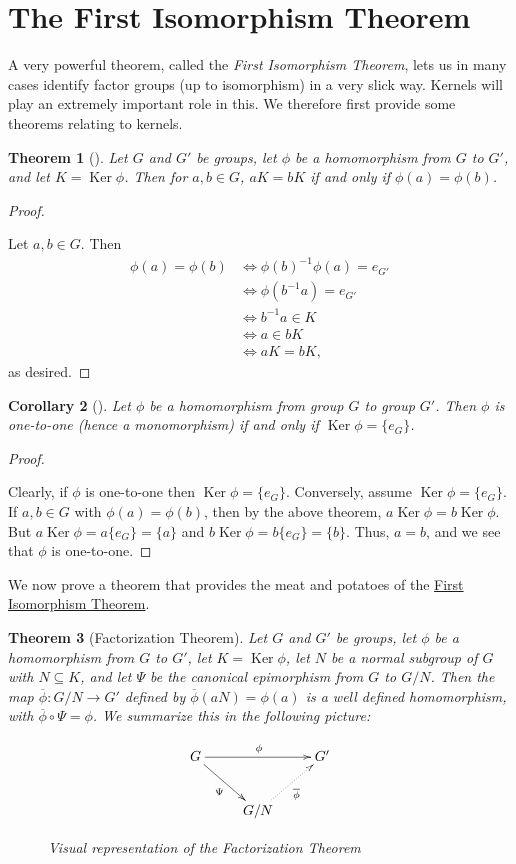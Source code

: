 \documentclass[10pt,]{book}
\theoremstyle{plain}
\newtheorem{theorem}{Theorem}[section]
\newtheorem{corollary}[theorem]{Corollary}
\theoremstyle{definition}
\theoremstyle{definition}
\theoremstyle{definition}
\theoremstyle{definition}
\numberwithin{equation}{section}
\def\phibar{\overline{\phi}}
\DeclareMathOperator{\Ker}{Ker}
\newcommand{\amp}{&}
\begin{document}
\section[{The First Isomorphism Theorem}]{The First Isomorphism Theorem}\label{section-28}
A very powerful theorem, called the \emph{First Isomorphism Theorem}, lets us in many cases identify factor groups (up to isomorphism) in a very slick way. Kernels will play an extremely important role in this. We therefore first provide some theorems relating to kernels.%
\begin{theorem}[{}]\label{kermean}
Let \(G\) and \(G'\) be groups, let \(\phi\) be a homomorphism from \(G\) to \(G'\), and let \(K=\Ker \phi\). Then for \(a,b\in G\), \(aK=bK\) if and only if \(\phi(a)=\phi(b)\).%
\end{theorem}
\begin{proof}\hypertarget{proof-49}{}
Let \(a,b\in G\). Then%
\begin{align*}
\phi(a)=\phi(b)\amp \Leftrightarrow
\phi(b)^{-1}\phi(a)=e_{G'}\\
\amp \Leftrightarrow \phi(b^{-1}a)=e_{G'}\\
\amp \Leftrightarrow b^{-1}a\in K\\
\amp \Leftrightarrow a \in bK\\
\amp \Leftrightarrow aK=bK,
\end{align*}
as desired.%
\end{proof}
\begin{corollary}[{}]\label{kerone}
Let \(\phi\) be a homomorphism from group \(G\) to group \(G'\). Then \(\phi\) is one-to-one (hence a monomorphism) if and only if \(\Ker \phi=\{e_G\}\).%
\end{corollary}
\begin{proof}\hypertarget{proof-50}{}
Clearly, if \(\phi\) is one-to-one then \(\Ker \phi=\{e_G\}\). Conversely, assume \(\Ker \phi=\{e_G\}\). If \(a,b\in G\) with \(\phi(a)=\phi(b)\), then by the above theorem, \(a\Ker \phi=b\Ker
\phi\). But \(a\Ker \phi=a\{e_G\}=\{a\}\) and \(b\Ker
\phi=b\{e_G\}=\{b\}\). Thus, \(a=b\), and we see that \(\phi\) is one-to-one.%
\end{proof}
We now prove a theorem that provides the meat and potatoes of the \hyperref[fit]{First Isomorphism Theorem}.%
\begin{theorem}[{Factorization Theorem}]\label{facthm}
Let \(G\) and \(G'\) be groups, let \(\phi\) be a homomorphism from \(G\) to \(G'\), let \(K=\Ker \phi\), let \(N\) be a normal subgroup of \(G\) with \(N\subseteq K\), and let \(\Psi\) be the canonical epimorphism from \(G\) to \(G/N\). Then the map \(\phibar: G/N \to G'\) defined by \(\phibar(aN)=\phi(a)\) is a well defined homomorphism, with \(\phibar \circ \Psi=\phi\).%
We  summarize this in the following picture:%
\begin{figure}
\centering
{
\[\xymatrix{G\ar[rr]^{\phi}\ar[dr]_{\Psi}&&G'\\&G/N\ar@{.>}[ur]_{\phibar}&}\]
}
\caption{Visual representation of the Factorization Theorem\label{figure-3}}
\end{figure}
\end{theorem}
\end{document}
